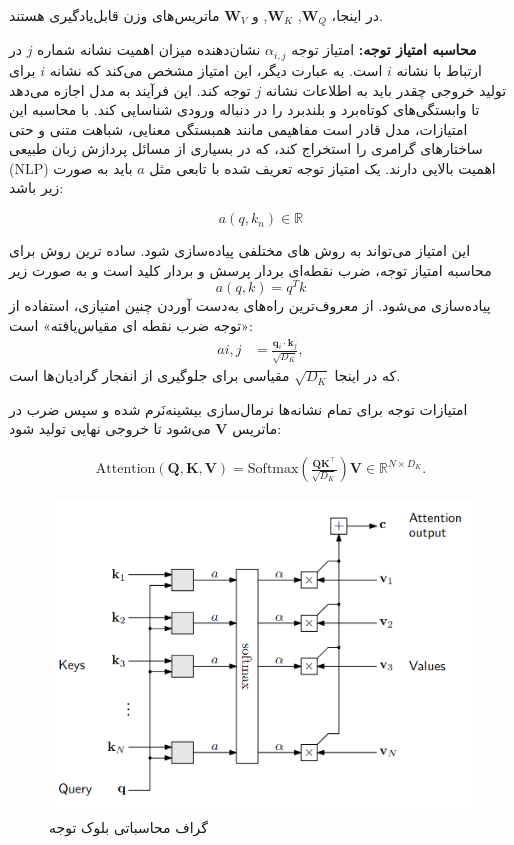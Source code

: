 در اینجا، $\mathbf{W}_Q$, $\mathbf{W}_K$, و $\mathbf{W}_V$ ماتریس‌های وزن قابل‌یادگیری هستند.

\textbf{محاسبه امتیاز توجه:} 
امتیاز توجه $\alpha_{i,j}$ نشان‌دهنده میزان اهمیت  نشانه%
شماره $j$ در ارتباط با نشانه $i$ است. به عبارت دیگر، این امتیاز مشخص می‌کند که نشانه $i$ برای تولید خروجی چقدر باید به اطلاعات نشانه $j$ توجه کند. این فرآیند به مدل اجازه می‌دهد تا وابستگی‌های کوتاه‌برد و بلند‌برد را در دنباله ورودی شناسایی کند. با محاسبه این امتیازات، مدل قادر است مفاهیمی مانند همبستگی معنایی، شباهت متنی و حتی ساختارهای گرامری را استخراج کند، که در بسیاری از مسائل پردازش زبان طبیعی (NLP) اهمیت بالایی دارند. یک امتیاز توجه تعریف شده با تابعی مثل $a$ باید به صورت زیر باشد:

$$
a(q,k_n) \in \mathbb{R}
$$

این امتیاز می‌تواند به روش های مختلفی پیاده‌سازی شود. ساده ترین روش برای محاسبه امتیاز توجه، ضرب نقطه‌ای بردار پرسش و بردار کلید است و  به صورت زیر
$$
a(q,k) = q^{T}k
$$
پیاده‌سازی می‌شود. از معروف‌ترین راه‌های به‌دست آوردن چنین امتیازی، استفاده از «توجه ضرب نقطه ای مقیاس‌یافته»%
است:
\begin{align*} 
	a{i,j} &= \frac{\mathbf{q}_i \cdot \mathbf{k}_j}{\sqrt{D_K}},
\end{align*}
که در اینجا $\sqrt{D_K}$ مقیاسی برای جلوگیری از انفجار گرادیان‌ها است.

امتیازات توجه برای تمام نشانه‌ها نرمال‌سازی بیشینه‌نَرم%
شده و سپس ضرب در ماتریس $\mathbf{V}$ می‌شود تا خروجی نهایی تولید شود:


\begin{align}
	\text{Attention}(\mathbf{Q}, \mathbf{K}, \mathbf{V}) = \text{Softmax}\left(\frac{\mathbf{Q} \mathbf{K}^\top}{\sqrt{D_K}}\right) \mathbf{V} \in \mathbb{R}^{N \times D_K}.
\end{align}

\begin{figure}
	\centering
	\includegraphics[width=0.7\linewidth]{figs/attnCompGraph}
	\caption{گراف محاسباتی بلوک توجه}
	\label{fig:attncompgraph}
\end{figure}


